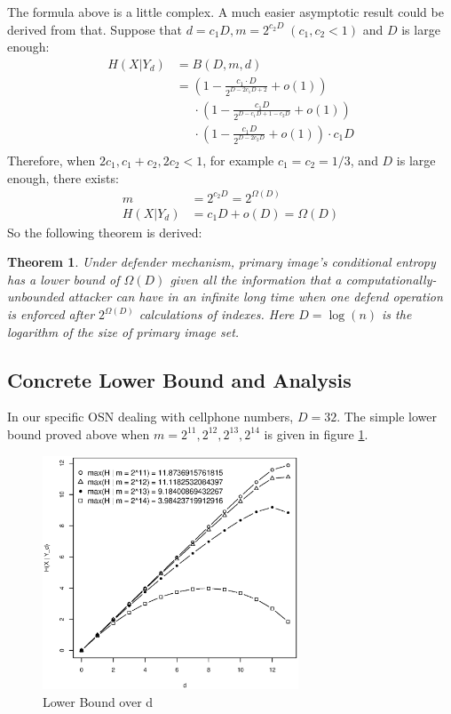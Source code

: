 \documentclass[10pt, conference, compsocconf]{IEEEtran}
\newtheorem{mytheorem}{Theorem}
\begin{document}
		The formula above is a little complex. A much easier asymptotic result
		could be derived from that. Suppose that
		$d = c_1 D, m = 2^{c_2 D} \; (c_1, c_2 < 1)$ and $D$ is large enough:
		\begin{align*}
			H(X | Y_d) &= B(D, m, d)\\
						&= \left(1-\frac{c_1 \cdot D}{ 2^{D-2 c_1 D+2} } + o(1) \right)\\
							&\;\;\;\;\; \cdot \left(1-\frac{c_1 D}{2^{D-c_1 D+1 - c_2 D}} + o(1) \right)\\
							&\;\;\;\;\; \cdot \left(1-\frac{c_1 D}{2^{D-2 c_2 D}} + o(1) \right) \cdot c_1 D\\
		\end{align*}
		Therefore, when $2c_1, c_1+c_2, 2c_2 < 1$, for example $c_1 = c_2 = 1/3$,
		and $D$ is large enough, there exists:
		\begin{align*}
			m &= 2^{c_2 D} = 2^{\Omega(D)}\\
			H(X | Y_d) &= c_1D+o(D) = \Omega(D)
		\end{align*}		
		So the following theorem is derived:
		\begin{mytheorem}
			Under defender mechanism,
			primary image's conditional entropy has a lower bound of $\Omega(D)$
			given all the information
			that a computationally-unbounded attacker can
			have in an infinite long time when one defend operation
			is enforced after $2^{\Omega(D)}$ calculations of indexes.
			Here $D = \log(n)$ is the
			logarithm of the size of primary image set.
		\end{mytheorem}
		
	\subsection{Concrete Lower Bound and Analysis}
		In our specific OSN dealing with cellphone numbers, 
		$D = 32$.
		The simple lower
		bound proved above when $m = 2^{11}, 2^{12}, 2^{13}, 2^{14}$ is given
		in figure \ref{lb_m}.
		
		\begin{figure}[!t]
		\centering
		\includegraphics[width=3in]{lb_m.eps}
		\caption{Lower Bound over d}\label{lb_m}
		\end{figure}		
\end{document}
